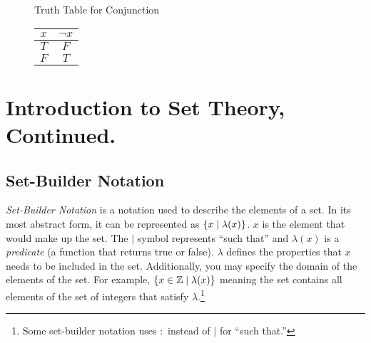 \begin{figure}[H]
    \centering
    Truth Table for Conjunction

    \begin{tabular}{cc}
        \(x\) & \(\lnot x\) \\
        \hline
        \(T\) & \(F\) \\
        \(F\) & \(T\) 
    \end{tabular}
\end{figure}

\section{Introduction to Set Theory, Continued.}

\subsection{Set-Builder Notation}

\emph{Set-Builder Notation} is a notation used to describe the elements of a set. In its most abstract form, it can be represented as \(\{x\mid\lambda(x)\}\).
\(x\) is the element that would make up the set. The \(\mid\) symbol represents ``such that'' and \(\lambda(x)\) is a \emph{predicate} (a function that returns true or false).
\(\lambda\) defines the properties that \(x\) needs to be included in the set. Additionally, you may specify the domain of the elements of the set. For example, 
\(\{x\in\mathbb{Z}\mid\lambda(x)\}\) meaning the set contains all elements of the set of integers that satisfy \(\lambda\).\footnote{Some set-builder notation
uses \(:\) instead of \(\mid\) for ``such that.''}

